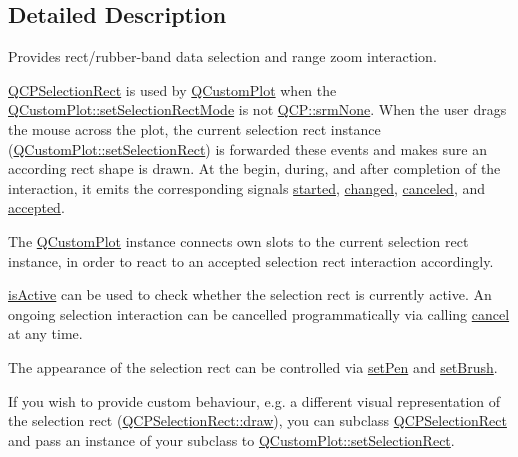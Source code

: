\subsection{Detailed Description}
Provides rect/rubber-\/band data selection and range zoom interaction. 

\hyperlink{class_q_c_p_selection_rect}{Q\+C\+P\+Selection\+Rect} is used by \hyperlink{class_q_custom_plot}{Q\+Custom\+Plot} when the \hyperlink{class_q_custom_plot_a810ef958ebe84db661c7288b526c0deb}{Q\+Custom\+Plot\+::set\+Selection\+Rect\+Mode} is not \hyperlink{namespace_q_c_p_ac9aa4d6d81ac76b094f9af9ad2d3aacfa9032f170490d67240a6c68c2638ffab1}{Q\+C\+P\+::srm\+None}. When the user drags the mouse across the plot, the current selection rect instance (\hyperlink{class_q_custom_plot_a0c09f96df15faa4799ad7051bb16cf33}{Q\+Custom\+Plot\+::set\+Selection\+Rect}) is forwarded these events and makes sure an according rect shape is drawn. At the begin, during, and after completion of the interaction, it emits the corresponding signals \hyperlink{class_q_c_p_selection_rect_a7b7162d19f4f2174d3644ff1a5d335aa}{started}, \hyperlink{class_q_c_p_selection_rect_a1bab11026bca52740c2e6682623e6964}{changed}, \hyperlink{class_q_c_p_selection_rect_aeb82009393c90130102dccf36477b906}{canceled}, and \hyperlink{class_q_c_p_selection_rect_a15a43542e1f7b953a44c260b419e6d2c}{accepted}.

The \hyperlink{class_q_custom_plot}{Q\+Custom\+Plot} instance connects own slots to the current selection rect instance, in order to react to an accepted selection rect interaction accordingly.

\hyperlink{class_q_c_p_selection_rect_ad27c1569c6ea8fa48e24b81e2a302df3}{is\+Active} can be used to check whether the selection rect is currently active. An ongoing selection interaction can be cancelled programmatically via calling \hyperlink{class_q_c_p_selection_rect_af67bc58f4f5ce9a4dc420b9c42de235a}{cancel} at any time.

The appearance of the selection rect can be controlled via \hyperlink{class_q_c_p_selection_rect_ada20b7fb1b2dcbe50523262636b06963}{set\+Pen} and \hyperlink{class_q_c_p_selection_rect_ab0c66f1484418782efa01f4153611080}{set\+Brush}.

If you wish to provide custom behaviour, e.\+g. a different visual representation of the selection rect (\hyperlink{class_q_c_p_selection_rect_ab0e50ae796508bdcd97ab8c335c593bf}{Q\+C\+P\+Selection\+Rect\+::draw}), you can subclass \hyperlink{class_q_c_p_selection_rect}{Q\+C\+P\+Selection\+Rect} and pass an instance of your subclass to \hyperlink{class_q_custom_plot_a0c09f96df15faa4799ad7051bb16cf33}{Q\+Custom\+Plot\+::set\+Selection\+Rect}. 

